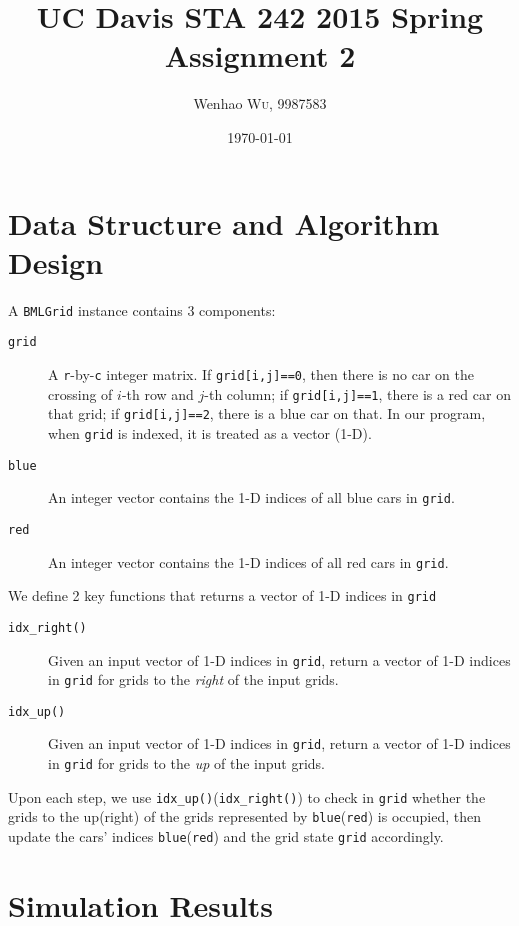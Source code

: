 \documentclass[twocolumn]{article}
\title{UC Davis STA 242 2015 Spring Assignment 2} %
\author{Wenhao \textsc{Wu}, 9987583} %
\date{\today} %
\begin{document}
\maketitle %


\section{Data Structure and Algorithm Design}
A \texttt{BMLGrid} instance contains 3 components:
\begin{description}
    \item[\texttt{grid}] A \texttt{r}-by-\texttt{c} integer matrix. If
    \texttt{grid[i,j]==0}, then there is no car on the crossing of $i$-th row
    and $j$-th column; if \texttt{grid[i,j]==1}, there is a red car on that
    grid; if \texttt{grid[i,j]==2}, there is a blue car on that. In our program,
    when \texttt{grid} is indexed, it is treated as a vector (1-D).
    \item[\texttt{blue}] An integer vector contains the 1-D indices of
    all blue cars in \texttt{grid}.
    \item[\texttt{red}] An integer vector contains the 1-D indices of
    all red cars in \texttt{grid}.
\end{description}
We define 2 key functions that returns a vector of 1-D
indices in \texttt{grid}
\begin{description}
    \item[\texttt{idx\_right()}] Given an input vector of 1-D indices in
    \texttt{grid}, return a vector of 1-D indices in \texttt{grid} for grids to
    the \emph{right} of the input grids.
    \item[\texttt{idx\_up()}] Given an input vector of 1-D indices in
    \texttt{grid}, return a vector of 1-D indices in \texttt{grid} for grids to
    the \emph{up} of the input grids.
\end{description}
Upon each step, we use \texttt{idx\_up()}(\texttt{idx\_right()}) to check in
\texttt{grid} whether the grids to the up(right) of the grids represented by
\texttt{blue}(\texttt{red}) is occupied, then update the cars' indices
\texttt{blue}(\texttt{red}) and the grid state \texttt{grid} accordingly.


\section{Simulation Results}
\end{document}
